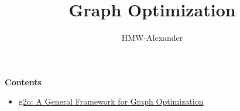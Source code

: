 \documentclass[letterpaper,11pt]{article}
\title{\textbf{Graph Optimization}}
\author{HMW-Alexander}
\begin{document}
\maketitle

\textbf{Contents}
\begin{itemize}
	\item \href{./g2o_A_General_Framework_for_Graph_Optimization/document.html}{g2o: A General Framework for Graph Optimization}
\end{itemize}
	
\end{document}
